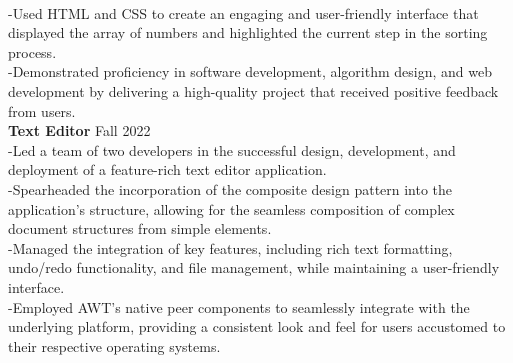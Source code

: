 \documentclass[10pt]{book}
\begin{document}
{        \\
        \hspace{2pt}-\hspace{6pt}Used HTML and CSS to create an engaging and user-friendly interface that 
        displayed the array of numbers and highlighted the current step in the sorting process.
        \\
        \hspace{2pt}-\hspace{6pt}Demonstrated proficiency in software development, algorithm design, and 
        web development by delivering a high-quality project that received positive feedback from users.
        \\
        {
            \noindent\fontsize{11}{11}
            \selectfont\hspace{-3pt}\textbf{Text Editor \textendash}\hfill Fall 2022
        }
        \\
        \hspace{2pt}-\hspace{6pt}Led a team of two developers in the successful design, development, and 
        deployment of a feature-rich text editor application.
        \\
        \hspace{2pt}-\hspace{6pt}Spearheaded the incorporation of the composite design pattern into the 
        application's structure, allowing for the seamless composition of complex document structures from simple elements.
        \\
        \hspace{2pt}-\hspace{6pt}Managed the integration of key features, including rich text formatting, 
        undo/redo functionality, and file management, while maintaining a user-friendly interface.
        \\
        \hspace{2pt}-\hspace{6pt}Employed AWT's native peer components to seamlessly integrate with the 
        underlying platform, providing a consistent look and feel for users accustomed to their respective operating systems.
        \fi
        \iffalse
        \begin{spacing}{0.2}
            {
                \noindent\fontsize{12}{12}
                \\
                \\
}
\end{spacing}}
\end{document}
